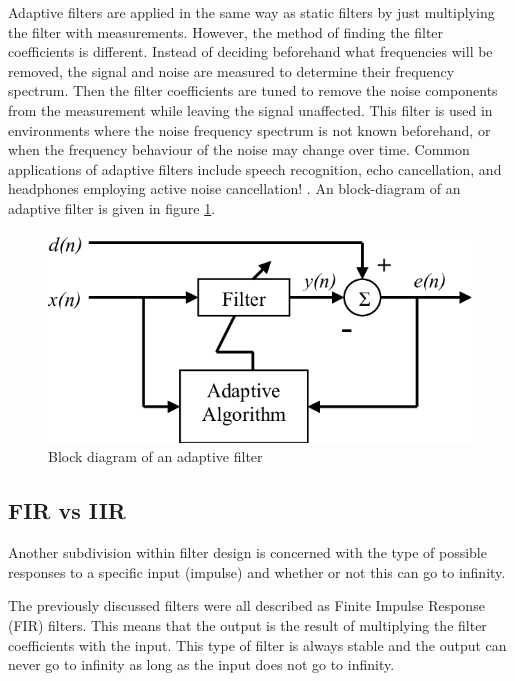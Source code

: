 Adaptive filters are applied in the same way as static filters by just multiplying the filter with measurements. However, the method of finding the filter coefficients is different. Instead of deciding beforehand what frequencies will be removed, the signal and noise are measured to determine their frequency spectrum. Then the filter coefficients are tuned to remove the noise components from the measurement while leaving the signal unaffected. This filter is used in environments where the noise frequency spectrum is not known beforehand, or when the frequency behaviour of the noise may change over time. Common applications of adaptive filters include speech recognition, echo cancellation, and headphones employing active noise cancellation! \cite{active_noise_cancellation_wiener_filter} \cite{wiener_vs_adaptive_realtime_noisecancellation}. An block-diagram of an adaptive filter is given in figure \ref{fig:adaptive_filter_diagram}.

\begin{figure}[h!t]
	\begin{center}
		\includegraphics[width=0.7\columnwidth]{images/adaptive_filter_block_diagram.png}
	\end{center}
	\caption{Block diagram of an adaptive filter \cite{adaptive_filter_block_diagram}}
	\label{fig:adaptive_filter_diagram}
\end{figure}


\subsection{FIR vs IIR}
Another subdivision within filter design is concerned with the type of possible responses to a specific input (impulse) and whether or not this can go to infinity.

The previously discussed filters were all described as Finite Impulse Response (FIR) filters. This means that the output is the result of multiplying the filter coefficients with the input. This type of filter is always stable and the output can never go to infinity as long as the input does not go to infinity.

